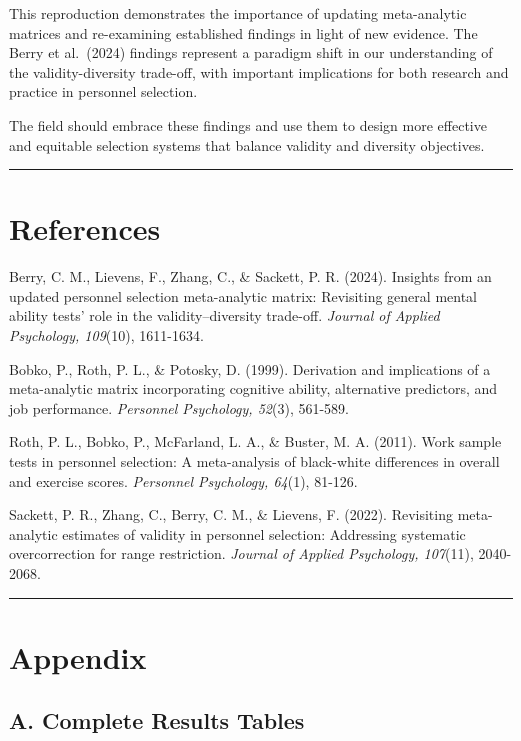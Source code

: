 \documentclass[
]{article}
\begin{document}
This reproduction demonstrates the importance of updating meta-analytic
matrices and re-examining established findings in light of new evidence.
The Berry et al.~(2024) findings represent a paradigm shift in our
understanding of the validity-diversity trade-off, with important
implications for both research and practice in personnel selection.

The field should embrace these findings and use them to design more
effective and equitable selection systems that balance validity and
diversity objectives.

\begin{center}\rule{0.5\linewidth}{0.5pt}\end{center}

\section{References}\label{references}

Berry, C. M., Lievens, F., Zhang, C., \& Sackett, P. R. (2024). Insights
from an updated personnel selection meta-analytic matrix: Revisiting
general mental ability tests' role in the validity--diversity trade-off.
\emph{Journal of Applied Psychology, 109}(10), 1611-1634.

Bobko, P., Roth, P. L., \& Potosky, D. (1999). Derivation and
implications of a meta-analytic matrix incorporating cognitive ability,
alternative predictors, and job performance. \emph{Personnel Psychology,
52}(3), 561-589.

Roth, P. L., Bobko, P., McFarland, L. A., \& Buster, M. A. (2011). Work
sample tests in personnel selection: A meta-analysis of black-white
differences in overall and exercise scores. \emph{Personnel Psychology,
64}(1), 81-126.

Sackett, P. R., Zhang, C., Berry, C. M., \& Lievens, F. (2022).
Revisiting meta-analytic estimates of validity in personnel selection:
Addressing systematic overcorrection for range restriction.
\emph{Journal of Applied Psychology, 107}(11), 2040-2068.

\begin{center}\rule{0.5\linewidth}{0.5pt}\end{center}

\section{Appendix}\label{appendix}

\subsection{A. Complete Results
Tables}\label{a.-complete-results-tables}
\end{document}
